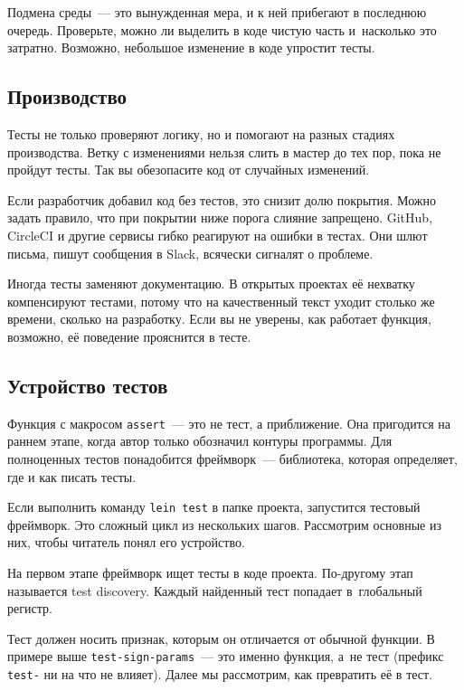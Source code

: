 Подмена среды~--- это вынужденная мера, и к ней прибегают в последнюю
очередь. Проверьте, можно ли выделить в коде чистую часть и~насколько это
затратно. Возможно, небольшое изменение в коде упростит тесты.

\subsection{Производство}


Тесты не только проверяют логику, но и помогают на разных стадиях
производства. Ветку с изменениями нельзя слить в мастер до тех пор, пока не
пройдут тесты. Так вы обезопасите код от случайных изменений.

Если разработчик добавил код без тестов, это снизит долю покрытия. Можно задать
правило, что при покрытии ниже порога слияние запрещено. GitHub, CircleCI и
другие сервисы гибко реагируют на ошибки в тестах. Они шлют письма, пишут
сообщения в Slack, всячески сигналят о проблеме.

Иногда тесты заменяют документацию. В открытых проектах её нехватку
компенсируют тестами, потому что на качественный текст уходит столько же
времени, сколько на разработку. Если вы не уверены, как работает функция,
возможно, её поведение прояснится в тесте.

\subsection{Устройство тестов}

Функция с макросом \verb|assert|~--- это не тест, а приближение. Она пригодится на
раннем этапе, когда автор только обозначил контуры программы. Для полноценных
тестов понадобится фреймворк~--- библиотека, которая определяет, где и как писать
тесты.

Если выполнить команду \verb|lein test| в папке проекта, запустится тестовый
фреймворк. Это сложный цикл из нескольких шагов. Рассмотрим основные из них,
чтобы читатель понял его устройство.

На первом этапе фреймворк ищет тесты в коде проекта. По-другому этап называется
test discovery. Каждый найденный тест попадает в~глобальный регистр.

Тест должен носить признак, которым он отличается от обычной функции. В примере
выше \verb|test-sign-params|~--- это именно функция, а~не тест (префикс \verb|test-|
ни на что не влияет). Далее мы рассмотрим, как превратить её в тест.

